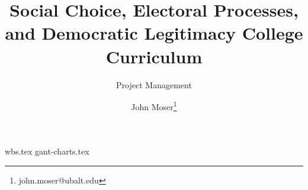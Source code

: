 \documentclass[twoside,titlepage,12pt,appendixprefix=true,usenames,dvipsnames]{scrreprt}
\begin{document}
    \author{John Moser\thanks{john.moser@ubalt.edu}}

    \title{Social Choice, Electoral Processes, and Democratic Legitimacy College Curriculum}
    \subtitle{Project Management}
    \maketitle
    \addtocounter{page}{-1}
    \tableofcontents
    \clearpage
    {wbs.tex}
    {gant-charts.tex}


\end{document}
